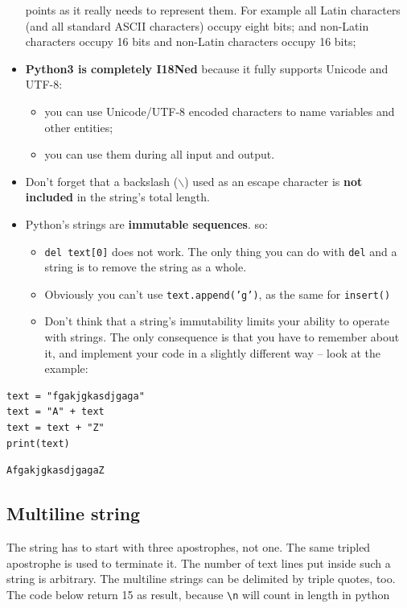 \documentclass[11pt]{article}
\begin{document}
\begin{itemize}
points as it really needs to represent them. For example all Latin
characters (and all standard ASCII characters) occupy eight bits;
and non-Latin characters occupy 16 bits and non-Latin characters
occupy 16 bits;
\item \textbf{Python3 is completely I18Ned} because it fully supports Unicode and
UTF-8:
\begin{itemize}
\item you can use Unicode/UTF-8 encoded characters to name variables and
other entities;
\item you can use them during all input and output.
\end{itemize}
\item Don’t forget that a backslash ($\backslash$) used as an escape character is \textbf{not included} 
in the string’s total length.
\item Python’s strings are \textbf{immutable sequences}. so:
\begin{itemize}
\item \texttt{del text[0]} does not work. The only thing you can do with \texttt{del} and a string is to remove the string as a whole.
\item Obviously you can't use \texttt{text.append('g')}, as the same for \texttt{insert()}
\item Don’t think that a string’s immutability limits your ability to
operate with strings. The only consequence is that you have to
remember about it, and implement your code in a slightly different
way – look at the example:
\end{itemize}
\end{itemize}

\begin{verbatim}
text = "fgakjgkasdjgaga"
text = "A" + text
text = text + "Z"
print(text)
\end{verbatim}

\begin{verbatim}
AfgakjgkasdjgagaZ
\end{verbatim}

\subsection{Multiline string}
\label{sec:org6d863f3}
The string has to start with three apostrophes, not one. The same
tripled apostrophe is used to terminate it. The number of text lines
put inside such a string is arbitrary. The multiline strings can be
delimited by triple quotes, too. The code below return 15 as result,
because \texttt{\textbackslash{}n} will count in length in python
\end{document}
